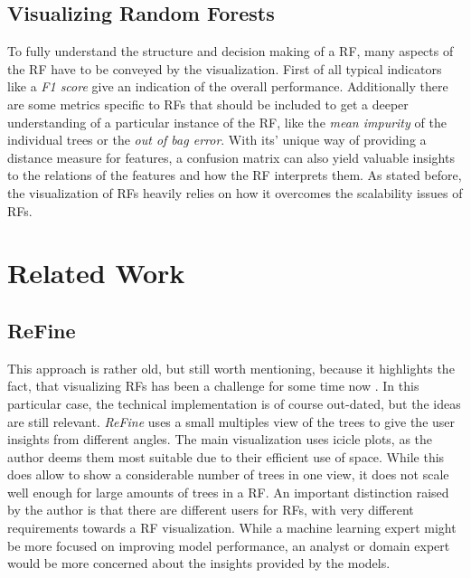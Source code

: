 \documentclass[a4paper, 12pt]{article}
\begin{document}
\subsection{Visualizing Random Forests}
To fully understand the structure and decision making of a RF, many aspects of the RF have to
be conveyed by the visualization. First of all typical indicators like a \textit{F1 score}
give an indication of the overall performance. Additionally there are some metrics specific
to RFs that should be included to get a deeper understanding of a particular instance of the
RF, like the \textit{mean impurity} of the individual trees or the \textit{out of bag error}.
With its' unique way of providing a distance measure for features,
a confusion matrix can also yield valuable insights to the relations of the features and how
the RF interprets them. As stated before, the visualization of RFs heavily relies on how it
overcomes the scalability issues of RFs.

\section{Related Work}

\subsection{ReFine}
This approach is rather old, but still worth mentioning, because it highlights the fact,
that visualizing RFs has been a challenge for some time now \cite{kuznetsova2014random}.
In this particular case, the technical implementation is of course out-dated, but
the ideas are still relevant. \textit{ReFine} uses a small multiples view of the trees to give the user
insights from different angles. The main visualization uses icicle plots, as the author
deems them most suitable due to their efficient use of space. While this does allow to
show a considerable number of trees in one view, it does not scale well enough for large
amounts of trees in a RF.
An important distinction raised by the author is that there are different users for RFs,
with very different requirements towards a RF visualization. While a machine learning
expert might be more focused on improving model performance, an analyst or domain expert
would be more concerned about the insights provided by the models.
\end{document}

